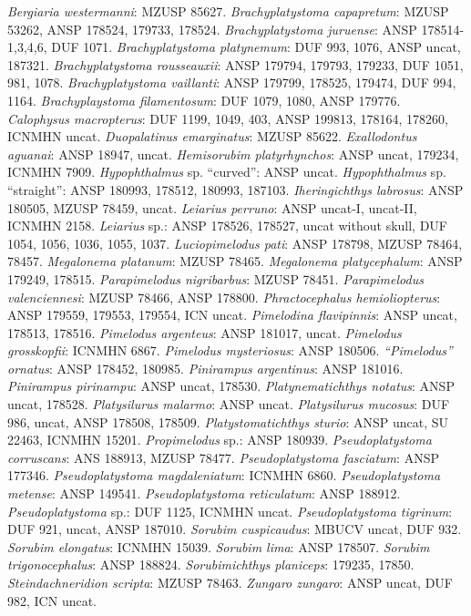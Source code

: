 \textit{Bergiaria westermanni}: MZUSP 85627. \textit{Brachyplatystoma capapretum}: MZUSP 53262, ANSP 178524, 179733, 178524. \textit{Brachyplatystoma juruense}: ANSP 178514-1,3,4,6, DUF 1071. \textit{Brachyplatystoma platynemum}: DUF 993, 1076, ANSP uncat, 187321. \textit{Brachyplatystoma rousseauxii}: ANSP 179794, 179793, 179233, DUF 1051, 981, 1078. \textit{Brachyplatystoma vaillanti}: ANSP 179799, 178525, 179474, DUF 994, 1164. \textit{Brachyplaystoma filamentosum}: DUF 1079, 1080, ANSP 179776. \textit{Calophysus macropterus}: DUF 1199, 1049, 403, ANSP 199813, 178164, 178260, ICNMHN uncat. \textit{Duopalatinus emarginatus}: MZUSP 85622. \textit{Exallodontus aguanai}: ANSP 18947, uncat. \textit{Hemisorubim platyrhynchos}: ANSP uncat, 179234, ICNMHN 7909. \textit{Hypophthalmus} sp. ``curved'': ANSP uncat. \textit{Hypophthalmus} sp. ``straight'': ANSP 180993, 178512, 180993, 187103. \textit{Iheringichthys labrosus}: ANSP 180505, MZUSP 78459, uncat. \textit{Leiarius perruno}: ANSP uncat-I, uncat-II, ICNMHN 2158. \textit{Leiarius} sp.: ANSP 178526, 178527, uncat without skull, DUF 1054, 1056, 1036, 1055, 1037. \textit{Luciopimelodus pati}: ANSP 178798, MZUSP 78464, 78457. \textit{Megalonema platanum}: MZUSP 78465. \textit{Megalonema platycephalum}: ANSP 179249, 178515. \textit{Parapimelodus nigribarbus}: MZUSP 78451. \textit{Parapimelodus valenciennesi}: MZUSP 78466, ANSP 178800. \textit{Phractocephalus hemioliopterus}: ANSP 179559, 179553, 179554, ICN uncat. \textit{Pimelodina flavipinnis}: ANSP uncat, 178513, 178516. \textit{Pimelodus argenteus}: ANSP 181017, uncat. \textit{Pimelodus grosskopfii}: ICNMHN 6867. \textit{Pimelodus mysteriosus}: ANSP 180506. \textit{``Pimelodus'' ornatus}: ANSP 178452, 180985. \textit{Pinirampus argentinus}: ANSP 181016. \textit{Pinirampus pirinampu}: ANSP uncat, 178530. \textit{Platynematichthys notatus}: ANSP uncat, 178528. \textit{Platysilurus malarmo}: ANSP uncat. \textit{Platysilurus mucosus}: DUF 986, uncat, ANSP 178508, 178509. \textit{Platystomatichthys sturio}: ANSP uncat, SU 22463, ICNMHN 15201. \textit{Propimelodus} sp.: ANSP 180939. \textit{Pseudoplatystoma corruscans}: ANS 188913, MZUSP 78477. \textit{Pseudoplatystoma fasciatum}: ANSP 177346. \textit{Pseudoplatystoma magdaleniatum}: ICNMHN 6860. \textit{Pseudoplatystoma metense}: ANSP 149541. \textit{Pseudoplatystoma reticulatum}: ANSP 188912. \textit{Pseudoplatystoma} sp.: DUF 1125, ICNMHN uncat. \textit{Pseudoplatystoma tigrinum}: DUF 921, uncat, ANSP 187010. \textit{Sorubim cuspicaudus}: MBUCV uncat, DUF 932. \textit{Sorubim elongatus}: ICNMHN 15039. \textit{Sorubim lima}: ANSP 178507. \textit{Sorubim trigonocephalus}: ANSP 188824. \textit{Sorubimichthys planiceps}: 179235, 17850. \textit{Steindachneridion scripta}: MZUSP 78463. \textit{Zungaro zungaro}: ANSP uncat, DUF 982, ICN uncat.